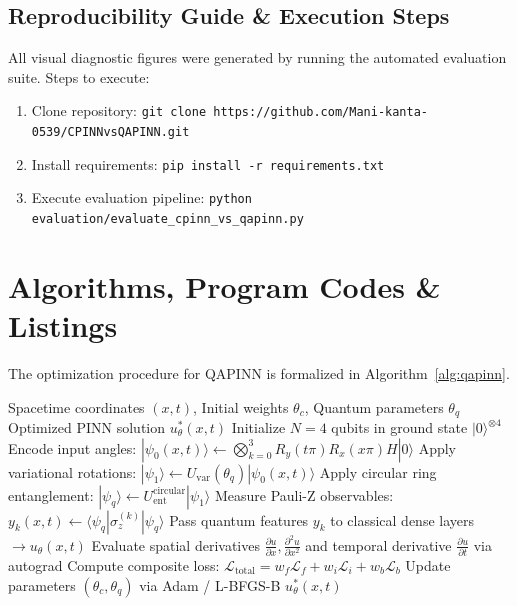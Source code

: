 \documentclass[pdflatex,sn-jnl]{sn-jnl}%
\begin{document}
\subsection{Reproducibility Guide \& Execution Steps}\label{sec6.9}
All visual diagnostic figures were generated by running the automated evaluation suite. Steps to execute:
\begin{enumerate}
    \item Clone repository: \texttt{git clone https://github.com/Mani-kanta-0539/CPINNvsQAPINN.git}
    \item Install requirements: \texttt{pip install -r requirements.txt}
    \item Execute evaluation pipeline: \texttt{python evaluation/evaluate\_cpinn\_vs\_qapinn.py}
\end{enumerate}

\section{Algorithms, Program Codes \& Listings}\label{sec7}
The optimization procedure for QAPINN is formalized in Algorithm~\ref{alg:qapinn}.

\begin{algorithm}[h]
\caption{QAPINN Forward \& Backward Optimization Pipeline}\label{alg:qapinn}
\begin{algorithmic}[1]
\Require Spacetime coordinates $(x,t)$, Initial weights $\theta_c$, Quantum parameters $\theta_q$
\Ensure Optimized PINN solution $u_\theta^*(x,t)$
\State Initialize $N=4$ qubits in ground state $|0\rangle^{\otimes 4}$
    \State Encode input angles: $|\psi_0(x,t)\rangle \gets \bigotimes_{k=0}^{3} R_y(t\pi) R_x(x\pi) H |0\rangle$
    \State Apply variational rotations: $|\psi_1\rangle \gets U_{\text{var}}(\theta_q) |\psi_0(x,t)\rangle$
    \State Apply circular ring entanglement: $|\psi_q\rangle \gets U_{\text{ent}}^{\text{circular}} |\psi_1\rangle$
    \State Measure Pauli-Z observables: $y_k(x,t) \gets \langle \psi_q | \sigma_z^{(k)} | \psi_q \rangle$
    \State Pass quantum features $y_k$ to classical dense layers $\to u_\theta(x,t)$
    \State Evaluate spatial derivatives $\frac{\partial u}{\partial x}, \frac{\partial^2 u}{\partial x^2}$ and temporal derivative $\frac{\partial u}{\partial t}$ via autograd
    \State Compute composite loss: $\mathcal{L}_{\text{total}} = w_f \mathcal{L}_f + w_i \mathcal{L}_i + w_b \mathcal{L}_b$
    \State Update parameters $(\theta_c, \theta_q)$ via Adam / L-BFGS-B
\EndFor
\State \Return $u_\theta^*(x,t)$
\end{algorithmic}
\end{algorithm}
\end{document}
